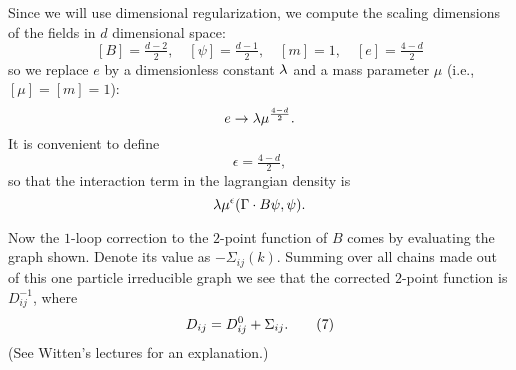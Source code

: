 Since we will use dimensional regularization, we compute
the scaling dimensions of the fields in $d$ dimensional
space:
$$
[B]=\tfrac{d-2}{2},\quad
[\psi]=\tfrac{d-1}{2},\quad
[m]=1,\quad
[e]=\tfrac{4-d}{2}
$$
so we replace $e$ by a dimensionless constant ${\lambda}$ and
a mass parameter $\mu$ (i.e., $[\mu]=[m]=1$):
$$
e\to{\lambda}\mu^{\frac{4-d}{2}}.
$$
It is convenient to define
$$
\epsilon=\tfrac{4-d}{2},
$$
so that the interaction term in the lagrangian density is
$$
{\lambda}\mu^\epsilon(\Gamma\cdot B\psi,\psi).
$$

Now the $1$-loop correction to the $2$-point function of
$B$ comes by evaluating the graph shown.
Denote its value as $-\Sigma_{ij}(k)$.
Summing over all chains made out of this one particle
irreducible graph we see that the corrected $2$-point
function is $D_{ij}^{-1}$, where
$$
D_{ij}=D_{ij}^0+\Sigma_{ij}.\tag7
$$
(See Witten's lectures for an explanation.)
